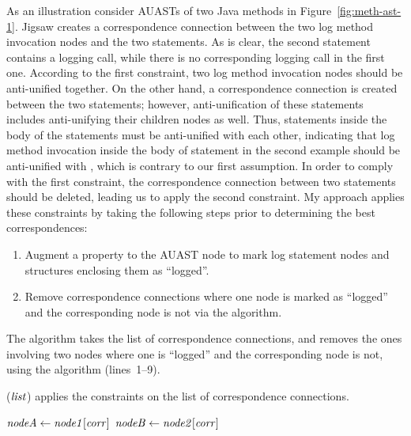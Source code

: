 As an illustration consider AUASTs of two Java methods in Figure~\ref{fig:meth-ast-1}. Jigsaw creates a correspondence connection between the two log method invocation nodes and the two  statements. As is clear, the second  statement contains a logging call, while there is no corresponding logging call in the first one. According to the first constraint, two log method invocation nodes should be anti-unified together. On the other hand, a correspondence connection is created between the two  statements; however, anti-unification of these statements includes anti-unifying their children nodes as well. Thus, statements inside the body of the  statements must be anti-unified with each other, indicating that log method invocation inside the body of  statement in the second example should be anti-unified with \nothing, which is contrary to our first assumption. In order to comply with the first constraint, the correspondence connection between two  statements should be deleted, leading us to apply the second constraint. My approach applies these constraints by taking the following steps prior to determining the best correspondences:
\begin{enumerate} [leftmargin=.4in]
\item	Augment a property to the AUAST node to mark log statement nodes and structures enclosing them as ``logged''.
\item	Remove correspondence connections where one node is marked as ``logged'' and the corresponding node is not via the  algorithm.
\end{enumerate}

The  algorithm takes the list of correspondence connections, and removes the ones involving two nodes where one is ``logged'' and the corresponding node is not, using the  algorithm (lines~1--9). 

\begin{algorithm}
  \caption{($\mathit{list}$) applies the constraints on the list of correspondence connections.}
  \label{computeMatches}
  \begin{algorithmic}[1]
  \ApplyConstraints
      \State $\mathit{nodeA} \gets \mathit{node1}[\mathit{corr}]$
	  \State $\mathit{nodeB} \gets \mathit{node2}[\mathit{corr}]$
	  \EndIf 		
 \EndFor 	
	
  \end{algorithmic}
\end{algorithm}



